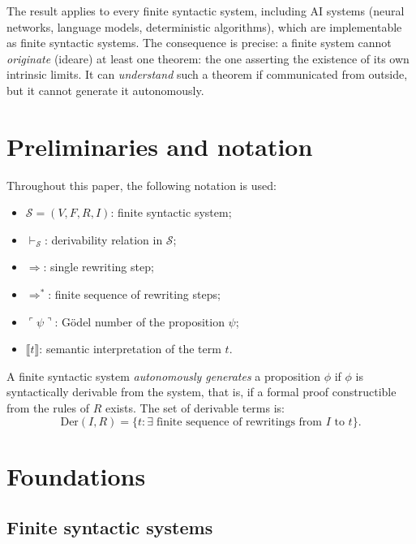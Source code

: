 \documentclass[11pt]{article}
\begin{document}
The result applies to every finite syntactic system, including AI systems
(neural networks, language models, deterministic algorithms), which are
implementable as finite syntactic systems. The consequence is precise: a
finite system cannot \emph{originate} (ideare) at least one theorem:
the one asserting the existence of its own intrinsic limits. It can
\emph{understand} such a theorem if communicated from outside, but it
cannot generate it autonomously.




\section{Preliminaries and notation}
\label{sec:notation}


Throughout this paper, the following notation is used:
\begin{itemize}
  \item $\mathcal{S} = (V, F, R, I)$: finite syntactic system;
  \item $\vdash_{\mathcal{S}}$: derivability relation in $\mathcal{S}$;
  \item $\Rightarrow$: single rewriting step;
  \item $\Rightarrow^*$: finite sequence of rewriting steps;
  \item $\ulcorner\psi\urcorner$: G\"odel number of the proposition
        $\psi$;
  \item $\llbracket t \rrbracket$: semantic interpretation of the term
        $t$.
\end{itemize}

A finite syntactic system \emph{autonomously generates} a proposition
$\phi$ if $\phi$ is syntactically derivable from the system, that is, if
a formal proof constructible from the rules of $R$ exists. The set of
derivable terms is:
\[
  \mathrm{Der}(I, R)
    = \{t : \exists\;\text{finite sequence of rewritings from }
      I \text{ to } t\}.
\]


\section{Foundations}
\label{sec:foundations}


\subsection{Finite syntactic systems}
\end{document}
